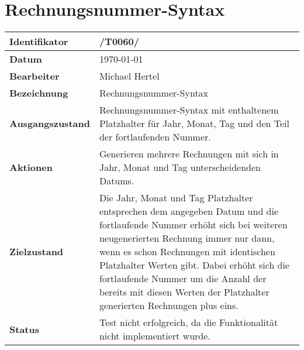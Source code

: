 
\section{Rechnungsnummer-Syntax}

\renewcommand{\arraystretch}{1.5}

\begin{center}
 \begin{tabular}{|p{}|p{}|}
	\hline
	\textbf{Identifikator}  & /T0060/ \\
	\hline
	\textbf{Datum} & \today \\
	\hline
	\textbf{Bearbeiter} & Michael Hertel \\
	\hline
	\textbf{Bezeichnung} & Rechnungsnummer-Syntax \\
	\hline
	\textbf{Ausgangszustand} & 
		Rechnungsnummer-Syntax mit enthaltenem Platzhalter für Jahr, Monat, Tag und den Teil der fortlaufenden Nummer. \\
	\hline
	\textbf{Aktionen} & 
		Generieren mehrere Rechnungen mit sich in Jahr, Monat und Tag unterscheidenden Datums. \\
	\hline
	\textbf{Zielzustand} & 
		Die Jahr, Monat und Tag Platzhalter entsprechen dem angegeben Datum und die fortlaufende Nummer erhöht sich bei weiteren neugenerierten Rechnung immer nur dann, wenn es schon Rechnungen mit identischen Platzhalter Werten gibt. Dabei erhöht sich die fortlaufende Nummer um die Anzahl der bereits mit diesen Werten der Platzhalter generierten Rechnungen plus eins. \\
	\hline
	\textbf{Status} & Test nicht erfolgreich, da die Funktionalität nicht implementiert wurde. \\
	\hline
 \end{tabular}
\end{center}
